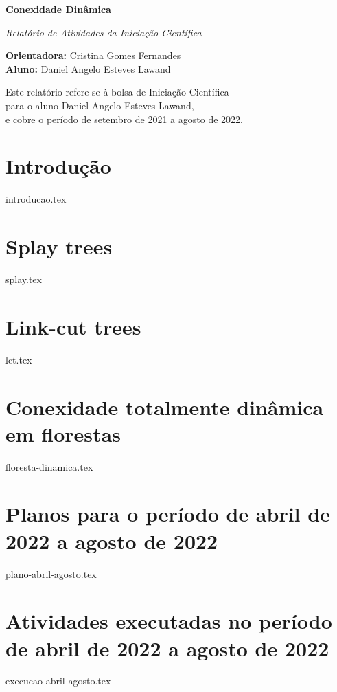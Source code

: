\documentclass[12pt]{article}
\begin{document}
\begin{center}

{\Large {\bf Conexidade Dinâmica}} 

\vspace{0.2cm}
{\large {\em Relatório de Atividades da Iniciação Científica}
}

\vspace{0.2cm}
{\small 
{\bf Orientadora:} Cristina Gomes Fernandes \\
{\bf Aluno:} Daniel Angelo Esteves Lawand
}

\vspace*{\fill}
{\small Este relatório refere-se à bolsa de Iniciação Científica \\
para o aluno Daniel Angelo Esteves Lawand,\\ 
e cobre o período de setembro de 2021 a agosto de 2022.}

\end{center}
\vspace*{\fill}

\newpage

\section{Introdução}  
{introducao.tex}

\section{Splay trees}  
{splay.tex}

\section{Link-cut trees}  
{lct.tex}

\section{Conexidade totalmente dinâmica em florestas}  
{floresta-dinamica.tex}

\section{Planos para o período de abril de 2022 a agosto de 2022}  
{plano-abril-agosto.tex}

\section{Atividades executadas no período de abril de 2022 a agosto de 2022}  
{execucao-abril-agosto.tex}



\end{document}
